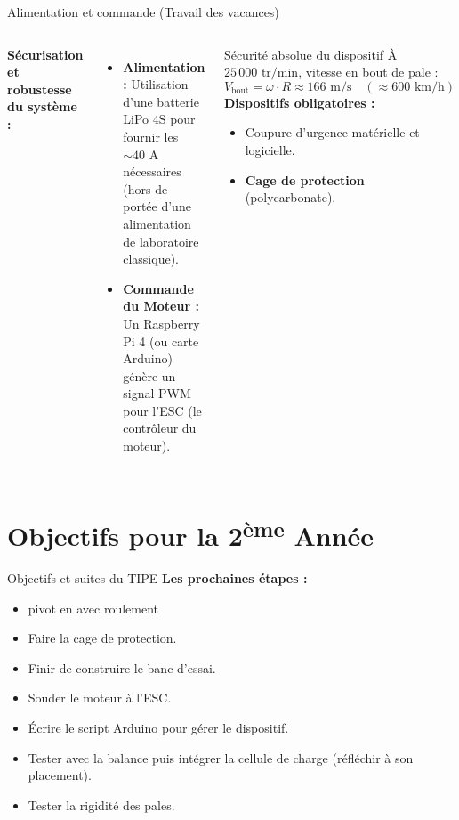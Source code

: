 \documentclass[aspectratio=169]{beamer}
\begin{document}
\begin{frame}{Alimentation et commande (Travail des vacances)}
  \begin{columns}
    \textbf{Sécurisation et robustesse du système :}
    \begin{itemize}
      \item \textbf{Alimentation : } Utilisation d'une batterie LiPo 4S pour fournir les $\sim 40\text{ A}$ nécessaires (hors de portée d'une alimentation de laboratoire classique).
      \item \textbf{Commande du Moteur :} Un Raspberry Pi 4 (ou carte Arduino) génère un signal PWM pour l'ESC (le contrôleur du moteur).
    \end{itemize}

    \begin{alertblock}{Sécurité absolue du dispositif}
      \small
      À $25\,000\text{ tr/min}$, vitesse en bout de pale :
      \[
        V_{\text{bout}} = \omega \cdot R \approx 166\text{ m/s} \quad (\approx 600\text{ km/h})
      \]
      \textbf{Dispositifs obligatoires :}
      \begin{itemize}
        \item Coupure d'urgence matérielle et logicielle.
        \item \textbf{Cage de protection} (polycarbonate).
      \end{itemize}
    \end{alertblock}
  \end{columns}
\end{frame}

\section{Objectifs pour la 2\texorpdfstring{\textsuperscript{ème}}{ème} Année}

\begin{frame}{Objectifs et suites du TIPE}
  \textbf{Les prochaines étapes :}
  \begin{itemize}
    \item pivot en avec roulement
    \item Faire la cage de protection.
    \item Finir de construire le banc d'essai.
    \item Souder le moteur à l'ESC.
    \item Écrire le script Arduino pour gérer le dispositif.
    \item Tester avec la balance puis intégrer la cellule de charge (réfléchir à son placement).
    \item Tester la rigidité des pales.
  \end{itemize}
\end{frame}
\end{document}
